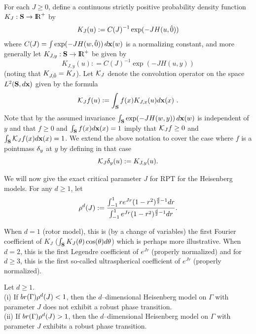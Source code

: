 For each $J\ge 0$, define a continuous strictly positive 
probability density function 
$K_J : \S \rightarrow \R^+$ by 
\begin{equation} \label{eq:KJ}
K_J (u): = C(J)^{-1} \exp (- J H (u , \zero)) 
\end{equation}
where $C(J) = \int \exp (- J H(w,\zero)) \, \dx (w)$ is a normalizing
constant, and more generally let
$K_{J,y} : \S \rightarrow \R^+$ be given by 
\begin{equation} \label{eq:KJy}
K_{J,y} (u): = C(J)^{-1} \exp (- J H (u , y)) 
\end{equation}
(noting that $K_{J,\zero}=K_{J}$).
Let $\KJ$ denote the convolution operator on the space
$L^2 (\S , \dx)$ given by the formula
\begin{equation} \label{eq:conv}
 \KJ f (u) : = \int_{\S} f(x) K_{J,x} (u) \dx(x) \,\, .
\end{equation}
Note that by the assumed invariance $\int_{\S} \exp (- J H(w,y)) \, \dx (w)$
is independent of $y$ and that $f\ge 0$ and $\int_{\S} f(x) \dx(x)=1$ imply
that $\KJ f\ge 0$ and $\int_{\S} \KJ f(x) \dx(x)=1$.
We extend the above notation to cover the case where $f$ is a pointmass $\p_y$ 
at $y$ by defining in that case 
\begin{equation} \label{eq:pointconv}
\KJ \p_y (u) : = K_{J , y}(u) .
\end{equation}


We will now give the exact critical
parameter $J$ for RPT for the Heisenberg models. For any $d\ge 1$, let 
$$
\calrdJ:= {\int_{-1}^1 r e^{Jr}(1-r^2)^{{d \over 2}-1} dr \over
\int_{-1}^1  e^{Jr}(1-r^2)^{{d \over 2}-1} dr }.
$$

When $d=1$ (rotor model), this is (by a change of variables)
the first Fourier coefficient  of $K_J$
($\int_{\S} K_J(\theta) \cos (\theta) d\theta$) which is perhaps
more illustrative.
When $d=2$, this is the first Legendre coefficient 
of $e^{Jr}$ (properly normalized) and for $d\ge 3$,
this is the first so-called ultraspherical coefficient of $e^{Jr}$ 
(properly normalized).

\begin{th} \label{th:main} Let $d\ge 1$. \\
(i) If $\textstyle {br} (\Gamma) \calrdJ <1$,
then the $d$--dimensional Heisenberg model on $\Gamma$ with
parameter $J$ does not exhibit a robust phase transition. \\
(ii) If $\textstyle{br}(\Gamma) \calrdJ >1$, then the $d$--dimensional
Heisenberg model on $\Gamma$ with parameter $J$ exhibits a robust phase 
transition.
\end{th}

